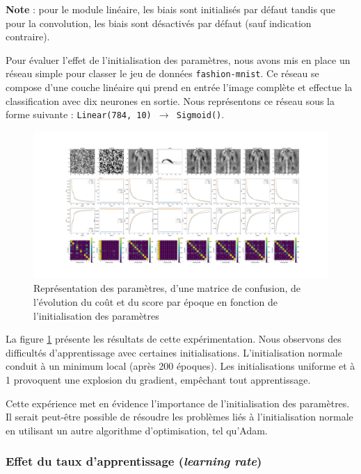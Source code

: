 \documentclass{article}
\begin{document}
\textbf{Note} : pour le module linéaire, les biais sont initialisés par défaut tandis que pour la convolution, les biais sont désactivés par défaut (sauf indication contraire).

Pour évaluer l'effet de l'initialisation des paramètres, nous avons mis en place un réseau simple pour classer le jeu de données \texttt{fashion-mnist}. Ce réseau se compose d'une couche linéaire qui prend en entrée l'image complète et effectue la classification avec dix neurones en sortie. Nous représentons ce réseau sous la forme suivante : \texttt{Linear(784, 10) $ \rightarrow $ Sigmoid()}.

\begin{figure}[htbp]
    \centering
    \includegraphics[width=\textwidth]{init_type.pdf}
    \caption{Représentation des paramètres, d'une matrice de confusion, de l'évolution du coût et du score par époque en fonction de l'initialisation des paramètres}
    \label{fig:initparam}
\end{figure}

La figure \ref{fig:initparam} présente les résultats de cette expérimentation. Nous observons des difficultés d'apprentissage avec certaines initialisations. L'initialisation normale conduit à un minimum local (après 200 époques). Les initialisations uniforme et à 1 provoquent une explosion du gradient, empêchant tout apprentissage.

Cette expérience met en évidence l'importance de l'initialisation des paramètres. Il serait peut-être possible de résoudre les problèmes liés à l'initialisation normale en utilisant un autre algorithme d'optimisation, tel qu'Adam.

\subsubsection{Effet du taux d'apprentissage (\textit{learning rate})}
\end{document}
